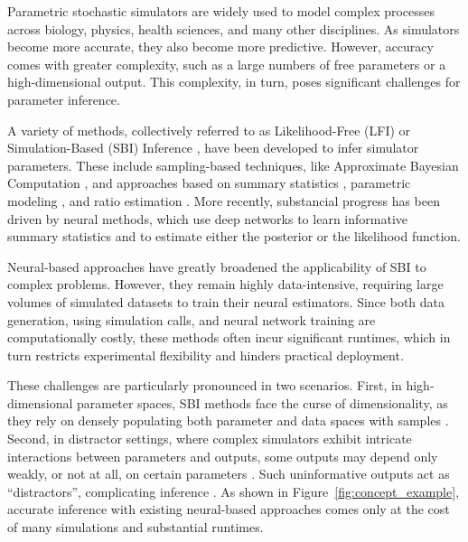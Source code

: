 \documentclass[twoside]{article}
\begin{document}
Parametric stochastic simulators are widely used to model complex processes across biology, physics, health sciences, and many other disciplines.
As simulators become more accurate, they also become more predictive.
However, accuracy comes with greater complexity, such as a large numbers of free parameters or a high-dimensional output.
This complexity, in turn, poses significant challenges for parameter inference.

A variety of methods, collectively referred to as Likelihood-Free (LFI) or Simulation-Based (SBI) Inference \citep{lintusaari2017fundamentals, sisson2018handbook, cranmer2020frontier}, have been developed to infer simulator parameters.
These include sampling-based techniques, like Approximate Bayesian Computation \citep[ABC,][]{Marin2012}, and approaches based on summary statistics \citep{Chen2021a, Chen2023}, parametric modeling \citep{wood2010statistical, price2018bayesian}, and ratio estimation \citep{thomas2022likelihood, durkan2020contrastive}.
More recently, substancial progress has been driven by neural methods, which use deep networks to learn informative summary statistics \citep{radev2020bayesflow} and to estimate either the posterior \citep{greenberg2019automatic, papamakarios2016fast} or the likelihood \citep{papamakarios2019sequential} function.

Neural-based approaches have greatly broadened the applicability of SBI to complex problems.
However, they remain highly data-intensive, requiring large volumes of simulated datasets to train their neural estimators.
Since both data generation, using simulation calls, and neural network training are computationally costly, these methods often incur significant runtimes, which in turn restricts experimental flexibility and hinders practical deployment.

These challenges are particularly pronounced in two scenarios.
First, in high-dimensional parameter spaces, SBI methods face the curse of dimensionality, as they rely on densely populating both parameter and data spaces with samples \citep{lintusaari2017fundamentals, sisson2018handbook, cranmer2020frontier}.
Second, in distractor settings, where complex simulators exhibit intricate interactions between parameters and outputs, some outputs may depend only weakly, or not at all, on certain parameters \citep{Saltelli2008, MonsalveBravo2022}.
Such uninformative outputs act as ``distractors'', complicating inference \citep{lueckmann2021benchmarking}.
As shown in Figure~\ref{fig:concept_example}, accurate inference with existing neural-based approaches comes only at the cost of many simulations and substantial runtimes.
\end{document}
